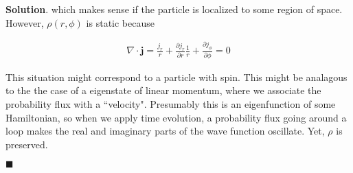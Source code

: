 \documentclass[12pt]{article}
\theoremstyle{definition}
\newenvironment{s}{%
        \begin{trivlist} \item \textbf{Solution}. }{%
            \hspace*{\fill} $\blacksquare$\end{trivlist}}%
\begin{document}
{\begin{s}
which makes sense if the particle is localized to some region of space. However, $\rho(r,\phi)$ is static because

\begin{align*}
\nabla \cdot \bm{j} = \frac{j_{r}}{r} + \frac{\partial j_{r}}{\partial r} \frac{1}{r} + \frac{\partial j_{\phi}}{\partial\phi} = 0
\end{align*}

This situation might correspond to a particle with spin. This might be analagous to the the case of a eigenstate of linear momentum, where we associate the probability flux with a ``velocity". Presumably this is an eigenfunction of some Hamiltonian, so when we apply time evolution, a probability flux going around a loop makes the real and imaginary parts of the wave function oscillate. Yet, $\rho$ is preserved.

\end{s}
\end{document}

